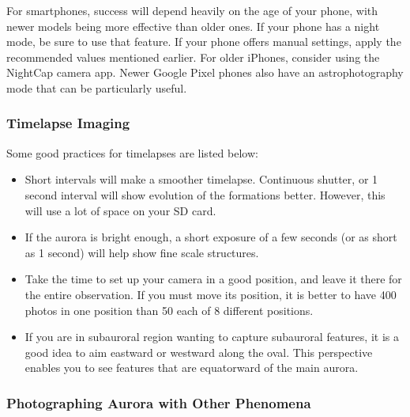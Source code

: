 \documentclass{article}
\begin{document}
For smartphones, success will depend heavily on the age of your phone, with newer models being more effective than older ones. If your phone has a night mode, be sure to use that feature. If your phone offers manual settings, apply the recommended values mentioned earlier. For older iPhones, consider using the NightCap camera app. Newer Google Pixel phones also have an astrophotography mode that can be particularly useful.

\subsubsection{Timelapse Imaging}

Some good practices for timelapses are listed below: 
\begin{itemize}
    \item Short intervals will make a smoother timelapse. Continuous shutter, or 1 second interval will show evolution of the formations better. However, this will use a lot of space on your SD card.
    \item If the aurora is bright enough, a short exposure of a few seconds (or as short as 1 second) will help show fine scale structures.
    \item Take the time to set up your camera in a good position, and leave it there for the entire observation. If you must move its position, it is better to have 400 photos in one position than 50 each of 8 different positions.
    \item If you are in subauroral region wanting to capture subauroral features, it is a good idea to aim eastward or westward along the oval. This perspective enables you to see features that are equatorward of the main aurora.
    
\end{itemize}

\subsubsection{Photographing Aurora with Other Phenomena}
\end{document}
